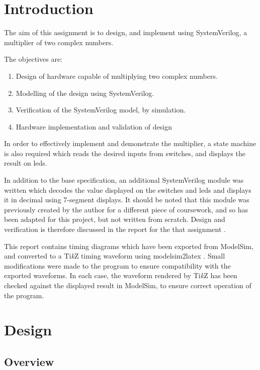 \section{Introduction} \label{sec:intro}
The aim of this assignment is to design, and implement using SystemVerilog, a multiplier of two complex numbers.

The objectives are:
\begin{enumerate}
	\item Design of hardware capable of multiplying two complex numbers.
	\item Modelling of the design using SystemVerilog.
	\item Verification of the SystemVerilog model, by simulation.
	\item Hardware implementation and validation of design
\end{enumerate}

In order to effectively implement and demonstrate the multiplier, a state machine is also required which reads the desired inputs from switches, and displays the result on \glspl{led}.

In addition to the base specification, an additional SystemVerilog module was written which decodes the value displayed on the switches and \glspl{led} and displays it in decimal using 7-segment displays. It should be noted that this module was previously created by the author for a different piece of coursework, and so has been adapted for this project, but not written from scratch. Design and verification is therefore discussed in the report for the that assignment \cite{tyler2017}.

This report contains timing diagrams which have been exported from ModelSim, and converted to a Ti\textit{k}Z timing waveform using modelsim2latex \cite{show2016}. Small modifications were made to the program to ensure compatibility with the exported waveforms. In each case, the waveform rendered by Ti\textit{k}Z has been checked against the displayed result in ModelSim, to ensure correct operation of the program.

\FloatBarrier
\section{Design} \label{sec:design}

\subsection{Overview} \label{sec:design-overview}

